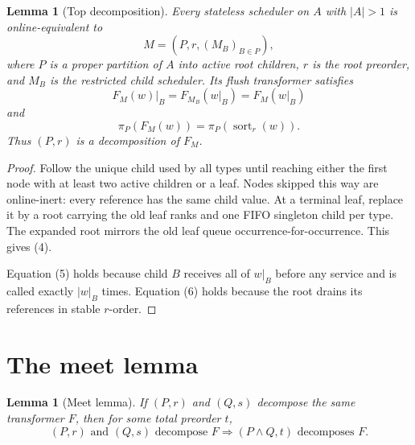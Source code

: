 \documentclass[11pt]{article}
\newtheorem{lemma}[definition]{Lemma}
\begin{document}
\begin{lemma}[Top decomposition]
Every stateless scheduler on $A$ with $|A|>1$ is online-equivalent to
\begin{equation}
M=(P,r,(M_B)_{B\in P}),
\tag{4}
\end{equation}
where $P$ is a proper partition of $A$ into active root children, $r$ is the root preorder, and $M_B$ is the restricted child scheduler.  Its flush transformer satisfies
\begin{equation}
F_M(w)|_B=F_{M_B}(w|_B)=F_M(w|_B)
\tag{5}
\end{equation}
and
\begin{equation}
\pi_P(F_M(w))
=
\pi_P(\operatorname{sort}_r(w)).
\tag{6}
\end{equation}
Thus $(P,r)$ is a decomposition of $F_M$.
\end{lemma}

\begin{proof}
Follow the unique child used by all types until reaching either the first node with at least two active children or a leaf.  Nodes skipped this way are online-inert: every reference has the same child value.  At a terminal leaf, replace it by a root carrying the old leaf ranks and one FIFO singleton child per type.  The expanded root mirrors the old leaf queue occurrence-for-occurrence.  This gives (4).

Equation (5) holds because child $B$ receives all of $w|_B$ before any service and is called exactly $|w|_B$ times.  Equation (6) holds because the root drains its references in stable $r$-order.
\end{proof}

\section{The meet lemma}

\begin{lemma}[Meet lemma]
If $(P,r)$ and $(Q,s)$ decompose the same transformer $F$, then for some total preorder $t$,
\begin{equation}
\boxed{
(P,r)\text{ and }(Q,s)\text{ decompose }F
\Longrightarrow
(P\wedge Q,t)\text{ decomposes }F.}
\tag{7}
\end{equation}
\end{lemma}
\end{document}
